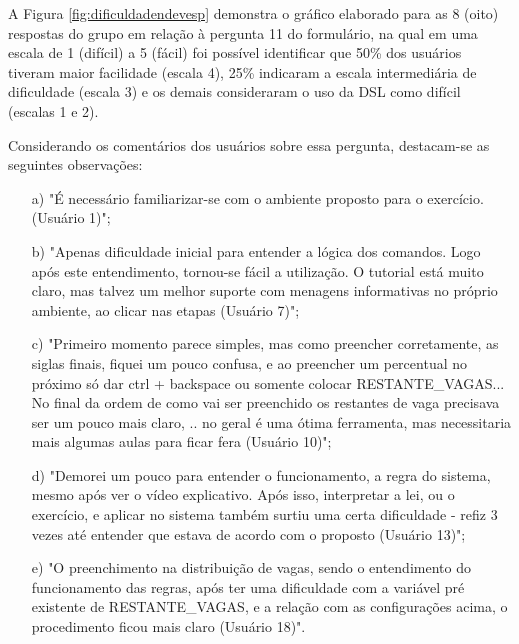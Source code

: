 A Figura \ref{fig:dificuldadendevesp} demonstra o gráfico elaborado para as 8 (oito) respostas do grupo em relação à pergunta 11 do formulário, na qual em uma escala de 1 (difícil) a 5 (fácil) foi possível identificar que 50\% dos usuários tiveram maior facilidade (escala 4), 25\% indicaram a escala intermediária de dificuldade (escala 3) e os demais consideraram o uso da DSL como difícil (escalas 1 e 2). 



Considerando os comentários dos usuários sobre essa pergunta, destacam-se as seguintes observações:

\begin{enumerate}
    \item [a)] "É necessário familiarizar-se com o ambiente proposto para o exercício.  (Usuário 1)";
    
    \item [b)] "Apenas dificuldade inicial para entender a lógica dos comandos. Logo após este entendimento, tornou-se fácil a utilização. O tutorial está muito claro, mas talvez um melhor suporte com menagens informativas no próprio ambiente, ao clicar nas etapas (Usuário 7)";
    
    \item [c)] "Primeiro momento parece simples, mas como preencher corretamente, as siglas finais, fiquei um pouco confusa, e ao preencher um percentual no próximo só dar ctrl + backspace ou somente colocar RESTANTE\_VAGAS... No final da ordem de como vai ser preenchido os restantes de vaga precisava ser um pouco mais claro, .. no geral é uma ótima ferramenta, mas necessitaria mais algumas aulas para ficar fera (Usuário 10)";
    
    \item [d)] "Demorei um pouco para entender o funcionamento, a regra do sistema, mesmo após ver o vídeo explicativo. Após isso, interpretar a lei, ou o exercício, e aplicar no sistema também surtiu uma certa dificuldade - refiz 3 vezes até entender que estava de acordo com o proposto (Usuário 13)";
    
    \item[e)] "O preenchimento na distribuição de vagas, sendo o entendimento do funcionamento das regras, após ter uma dificuldade com a variável pré existente de RESTANTE\_VAGAS, e a relação com as configurações acima, o procedimento ficou mais claro (Usuário 18)".
\end{enumerate}

